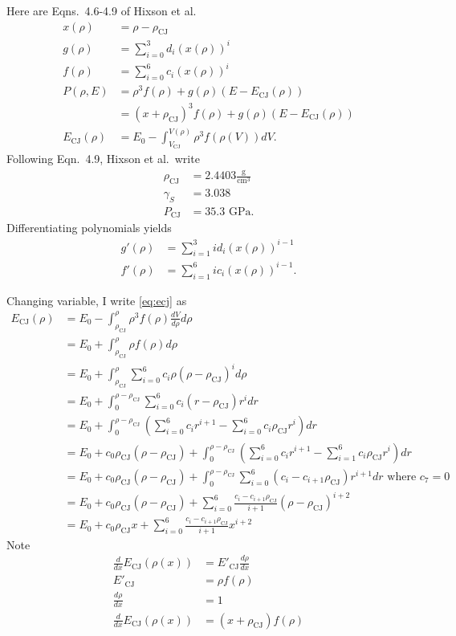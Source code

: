 \documentclass[]{article}
\begin{document}
Here are Eqns.\ 4.6-4.9 of Hixson et al.
\newcommand{\CJ}{_{\text{CJ}}}
\begin{align}
  x(\rho) &= \rho - \rho\CJ \\
  g(\rho) &= \sum_{i=0}^3 d_i \left( x(\rho) \right) ^i \\
  f(\rho) &= \sum_{i=0}^6 c_i \left( x(\rho) \right) ^i \\
  P(\rho,E) &= \rho^3 f(\rho) + g(\rho)(E - E\CJ (\rho) ) \\
  &= (x+\rho\CJ)^3f(\rho) + g(\rho)(E - E\CJ (\rho) ) \\
  \label{eq:ecj}
  E\CJ (\rho) &= E_0 - \int_{V\CJ}^{V(\rho)} \rho^3 f (\rho(V)) dV .
\end{align}
Following Eqn.\ 4.9, Hixson et al.\ write
\begin{align*}
  \rho\CJ &= 2.4403 \frac{\text{g}}{\text{cm}^3}\\
  \gamma_S &= 3.038 \\
  P\CJ &= 35.3 \text{ GPa} .
\end{align*}
Differentiating polynomials yields
\begin{align*}
  g'(\rho) &= \sum_{i=1}^3 i d_i \left( x(\rho) \right) ^{i-1} \\
  f'(\rho) &= \sum_{i=1}^6 i c_i \left( x(\rho) \right) ^{i-1}.
\end{align*}

Changing variable, I write \eqref{eq:ecj} as
\begin{align*}
   E\CJ (\rho) &= E_0 - \int_{\rho\CJ}^\rho \rho^3 f(\rho) \frac{dV}
   {d \rho} d \rho  \\
   &= E_0 + \int_{\rho\CJ}^\rho \rho f(\rho) d \rho \\
   &= E_0 + \int_{\rho\CJ}^\rho\sum_{i=0}^6 c_i \rho \left( \rho -
   \rho\CJ \right) ^i d \rho \\
   &= E_0 + \int_0^{\rho -\rho\CJ} \sum_{i=0}^6 c_i (r - \rho\CJ) r^i d r \\
   &= E_0 + \int_0^{\rho -\rho\CJ} \left( \sum_{i=0}^6 c_i r^{i+1}
     - \sum_{i=0}^6 c_i \rho\CJ r^i \right) d r \\
   &= E_0 + c_0 \rho\CJ (\rho - \rho\CJ) + \int_0^{\rho -\rho\CJ}
   \left( \sum_{i=0}^6 c_i r^{i+1}
     - \sum_{i=1}^6 c_i \rho\CJ r^i \right) d r \\
   &= E_0 + c_0 \rho\CJ (\rho - \rho\CJ) + \int_0^{\rho -\rho\CJ}
   \sum_{i=0}^6 \left( c_i - c_{i+1} \rho\CJ \right) r^{i+1} d r
   \text{ where } c_7 = 0\\
   &= E_0 + c_0 \rho\CJ (\rho - \rho\CJ) +
   \sum_{i=0}^6 \frac{ c_i - c_{i+1} \rho\CJ}{i+1} \left( \rho -
     \rho\CJ \right)^{i+2}\\
   &= E_0 + c_0 \rho\CJ x +
   \sum_{i=0}^6 \frac{ c_i - c_{i+1} \rho\CJ}{i+1} x^{i+2}
\end{align*}
Note
\begin{align*}
  \frac{d}{dx} E\CJ(\rho(x)) &= E'\CJ \frac{d \rho}{dx} \\
  E'\CJ &= \rho f(\rho) \\
  \frac{d \rho}{dx} &= 1 \\
  \frac{d}{dx} E\CJ(\rho(x)) &= (x+\rho\CJ)f(\rho)
\end{align*}
\end{document}
